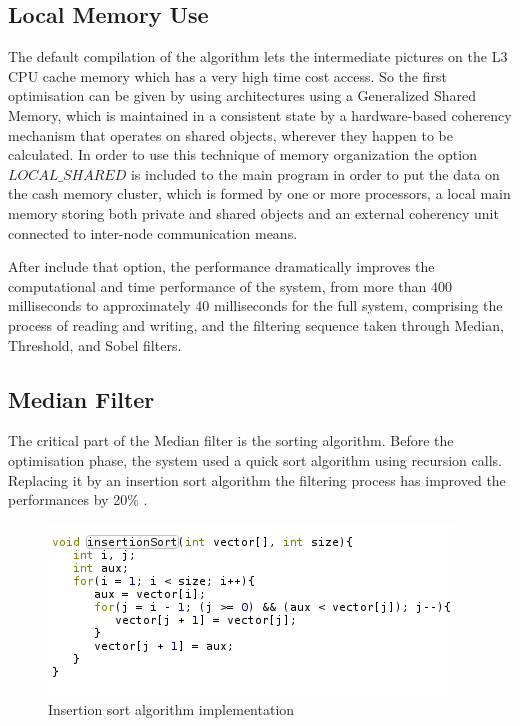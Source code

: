 \documentclass[journal]{IEEEtran}
\begin{document}
\subsection{Local Memory Use}

The default compilation of the algorithm lets the intermediate pictures on the L3 CPU cache memory which has a very high time cost access. So the first optimisation can be given by using architectures using a Generalized Shared Memory, which is maintained in a consistent state by a hardware-based coherency mechanism that operates on shared objects, wherever they happen to be calculated. In order to use this technique of memory organization the option \(LOCAL\_SHARED\) is included to the main program in order to put the data on the cash memory cluster, which is formed by one or more processors, a local main memory storing both private and shared objects and an external coherency unit connected to inter-node communication means.

After include that option, the performance dramatically improves the computational and time performance of the system, from more than \(400\) milliseconds to approximately \(40\) milliseconds for the full system, comprising the process of reading and writing, and the filtering sequence taken through Median, Threshold, and Sobel filters.

\subsection{Median Filter}

The critical part of the Median filter is the sorting algorithm. Before the optimisation phase, the system used a quick sort algorithm using recursion calls. Replacing it by an insertion sort algorithm the filtering process has improved the performances by 20\% . 

\begin{figure}[!ht]%
  \centering
  \captionsetup{justification=centering}
  \includegraphics[width=\columnwidth]{insersionSort.png}
  \caption{Insertion sort algorithm implementation}
\end{figure}
\end{document}
